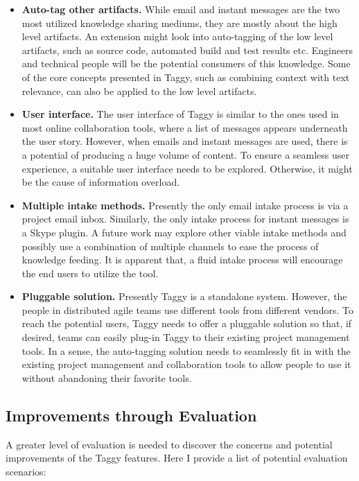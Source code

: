 \begin{itemize}
	\item \textbf{Auto-tag other artifacts.} While email and instant messages are the two most utilized knowledge sharing mediums, they are mostly about the high level artifacts. An extension might look into auto-tagging of the low level artifacts, such as source code, automated build and test results etc. Engineers and technical people will be the potential consumers of this knowledge. Some of the core concepts presented in Taggy, such as combining context with text relevance, can also be applied to the low level artifacts.
	
	\item \textbf{User interface.} The user interface of Taggy is similar to the ones used in most online collaboration tools, where a list of messages appears underneath the user story. However, when emails and instant messages are used, there is a potential of producing a huge volume of content. To ensure a seamless user experience, a suitable user interface needs to be explored. Otherwise, it might be the cause of information overload.
	
	\item \textbf{Multiple intake methods.} Presently the only email intake process is via a project email inbox. Similarly, the only intake process for instant messages is a Skype plugin. A future work may explore other viable intake methods and possibly use a combination of multiple channels to ease the process of knowledge feeding. It is apparent that, a fluid intake process will encourage the end users to utilize the tool.
	
	\item \textbf{Pluggable solution.} Presently Taggy is a standalone system. However, the people in distributed agile teams use different tools from different vendors. To reach the potential users, Taggy needs to offer a pluggable solution so that, if desired, teams can easily plug-in Taggy to their existing project management tools. In a sense, the auto-tagging solution needs to seamlessly fit in with the existing project management and collaboration tools to allow people to use it without abandoning their favorite tools.
\end{itemize}		
	
\subsection{Improvements through Evaluation}
A greater level of evaluation is needed to discover the concerns and potential improvements of the Taggy features. Here I provide a list of potential evaluation scenarios:

